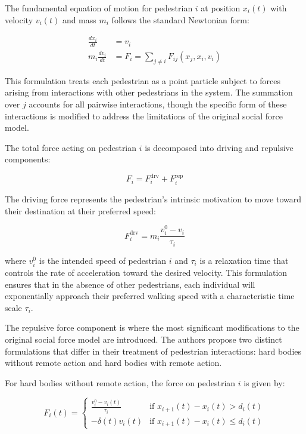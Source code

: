 \documentclass[12pt,a4paper]{article}
\begin{document}
The fundamental equation of motion for pedestrian $i$ at position $x_i(t)$ with velocity $v_i(t)$ and mass $m_i$ follows the standard Newtonian form:

\begin{align}
\frac{dx_i}{dt} &= v_i \\
m_i \frac{dv_i}{dt} &= F_i = \sum_{j \neq i} F_{ij}(x_j, x_i, v_i)
\end{align}

This formulation treats each pedestrian as a point particle subject to forces arising from interactions with other pedestrians in the system. The summation over $j$ accounts for all pairwise interactions, though the specific form of these interactions is modified to address the limitations of the original social force model.

The total force acting on pedestrian $i$ is decomposed into driving and repulsive components:

\begin{equation}
F_i = F_i^{\text{drv}} + F_i^{\text{rep}}
\end{equation}

The driving force represents the pedestrian's intrinsic motivation to move toward their destination at their preferred speed:

\begin{equation}
F_i^{\text{drv}} = m_i \frac{v_i^0 - v_i}{\tau_i}
\end{equation}

where $v_i^0$ is the intended speed of pedestrian $i$ and $\tau_i$ is a relaxation time that controls the rate of acceleration toward the desired velocity. This formulation ensures that in the absence of other pedestrians, each individual will exponentially approach their preferred walking speed with a characteristic time scale $\tau_i$.

The repulsive force component is where the most significant modifications to the original social force model are introduced. The authors propose two distinct formulations that differ in their treatment of pedestrian interactions: hard bodies without remote action and hard bodies with remote action.

For hard bodies without remote action, the force on pedestrian $i$ is given by:

\begin{equation}
F_i(t) = \begin{cases}
\frac{v_i^0 - v_i(t)}{\tau_i} & \text{if } x_{i+1}(t) - x_i(t) > d_i(t) \\
-\delta(t) v_i(t) & \text{if } x_{i+1}(t) - x_i(t) \leq d_i(t)
\end{cases}
\end{equation}
\end{document}
